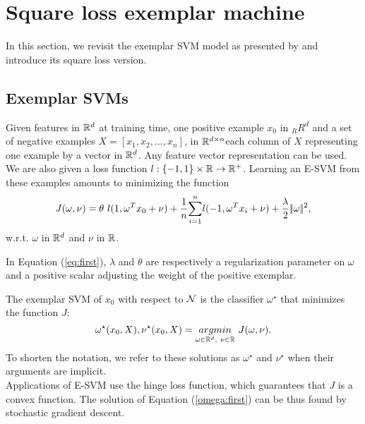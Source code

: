 \section{Square loss exemplar machine}\label{lsesvm}
In this section, we revisit the exemplar SVM model as presented by \cite{Efros11} and introduce its square loss version.
\subsection{Exemplar SVMs} \label{esvm}
Given features in $\mathbb R^d$ at training time, one positive example $x_0$ in $_RR^d$ and a set of negative examples $X = [x_1, x_2,...,x_n]$, in $\mathbb R^{d\times n}$each column of $X$ representing one example by a vector in $\mathbb R^d$. 
Any feature vector representation can be used.
We are also given a loss function $l:\{-1, 1\}\times \mathbb R\rightarrow\mathbb R^+$. Learning an E-SVM from these examples amounts to minimizing the function
\begin{equation}
J(\omega, \nu) = \theta \ l(1, \omega^Tx_0+\nu) +\dfrac{1}{n}\displaystyle{\sum_{i=1}^n} l(-1, \omega^T x_i+\nu)+\dfrac{\lambda}{2}|\!|\omega|\!|^2, \label{eq:first}
\end{equation}
w.r.t. $\omega$ in $\mathbb R^d$ and $\nu$ in $\mathbb R$.

In Equation (\ref{eq:first}), $\lambda$ and $\theta$ are respectively a regularization parameter on $\omega$ and a positive scalar adjusting the weight of the positive exemplar.

The  exemplar SVM of $x_0$ with respect to $\mathcal N$ is the classifier $\omega^\star$ that minimizes the function $J$:
\begin{equation}
\omega^\star(x_0, X), \nu^\star(x_0, X) = \underset{\omega\in\mathbb R^d, \ \nu\in\mathbb R}{argmin} \ J(\omega, \nu). \label{omega:first}
\end{equation}
To shorten the notation, we refer to these solutions as $\omega^\star$ and $\nu^\star$ when their arguments are implicit.\\
Applications of E-SVM use the hinge loss function, which guarantees that $J$ is a convex function. The solution of Equation (\ref{omega:first}) can be thus found by stochastic gradient descent.

